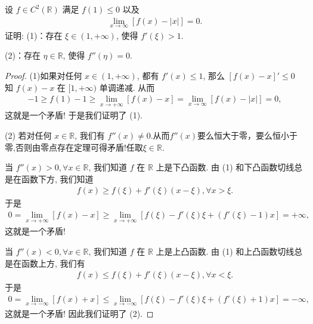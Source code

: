 \documentclass[../../main.tex]{subfiles}
\begin{document}
\begin{example}
设 $f\in C^2(\mathbb{R})$ 满足 $f(1)\leqslant0$ 以及
\begin{align*}
\lim_{x\to\infty}[f(x)-|x|]=0.
\tag{12.27}
\end{align*}
证明:
(1)：存在 $\xi\in(1,+\infty)$, 使得 $f'(\xi)>1$.

(2)：存在 $\eta\in\mathbb{R}$, 使得 $f''(\eta)=0$.
\end{example}
\begin{proof}
(1)如果对任何 $x\in(1,+\infty)$, 都有 $f'(x)\leqslant1$, 那么 $[f(x)-x]'\leqslant0$ 知 $f(x)-x$ 在 $[1,+\infty)$ 单调递减. 从而
\begin{align*}
-1\geqslant f(1)-1\geqslant\lim_{x\to+\infty}[f(x)-x]=\lim_{x\to\infty}[f(x)-|x|]=0,
\end{align*}
这就是一个矛盾! 于是我们证明了 (1).

(2)
若对任何 $x\in\mathbb{R}$, 我们有 $f''(x)\neq0$.从而$f''(x)$要么恒大于零，要么恒小于零,否则由零点存在定理可得矛盾!任取$\xi \in \mathbb{R}$.

当 $f''(x)>0,\forall x\in\mathbb{R}$, 我们知道 $f$ 在 $\mathbb{R}$ 上是下凸函数. 由 (1) 和下凸函数切线总是在函数下方, 我们知道
\begin{align*}
f(x)\geqslant f(\xi)+f'(\xi)(x-\xi),\forall x>\xi.
\end{align*}
于是
\begin{align*}
0=\lim_{x\to+\infty}[f(x)-x]\geqslant\lim_{x\to+\infty}[f(\xi)-f'(\xi)\xi+(f'(\xi)-1)x]=+\infty,
\end{align*}
这就是一个矛盾!

当 $f''(x)<0,\forall x\in\mathbb{R}$, 我们知道 $f$ 在 $\mathbb{R}$ 上是上凸函数. 由 (1) 和上凸函数切线总是在函数上方, 我们有
\begin{align*}
f(x)\leqslant f(\xi)+f'(\xi)(x-\xi),\forall x<\xi.
\end{align*}
于是
\begin{align*}
0=\lim_{x\to-\infty}[f(x)+x]\leqslant\lim_{x\to-\infty}[f(\xi)-f'(\xi)\xi+(f'(\xi)+1)x]=-\infty,
\end{align*}
这就是一个矛盾! 因此我们证明了 (2). 
\end{proof}
\end{document}
